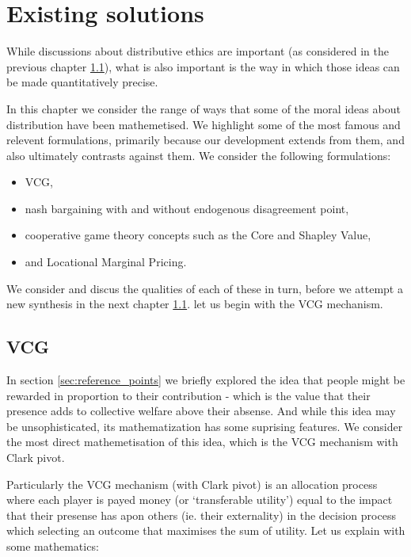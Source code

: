 \chapter{Existing solutions}
\label{cha:solutions}

While discussions about distributive ethics are important (as considered in the previous chapter \ref{}), what is also important is the way in which those ideas can be made quantitatively precise.

In this chapter we consider the range of ways that some of the moral ideas about distribution have been mathemetised.
We highlight some of the most famous and relevent formulations, primarily because our development extends from them, and also ultimately contrasts against them.
We consider the following formulations:
\begin{itemize}
\item VCG,
\item nash bargaining with and without endogenous disagreement point,
\item cooperative game theory concepts such as the Core and Shapley Value,
\item and Locational Marginal Pricing.
\end{itemize}

We consider and discus the qualities of each of these in turn, before we attempt a new synthesis in the next chapter \ref{}.
let us begin with the VCG mechanism.

\section{VCG}

In section \ref{sec:reference_points} we briefly explored the idea that people might be rewarded in proportion to their contribution - which is the value that their presence adds to collective welfare above their absense.
And while this idea may be unsophisticated, its mathematization has some suprising features.
We consider the most direct mathemetisation of this idea, which is the VCG mechanism with Clark pivot.

Particularly the VCG mechanism (with Clark pivot) is an allocation process where each player is payed money (or `transferable utility') equal to the impact that their presense has apon others (ie. their externality) in the decision process which selecting an outcome that maximises the sum of utility.
Let us explain with some mathematics:

